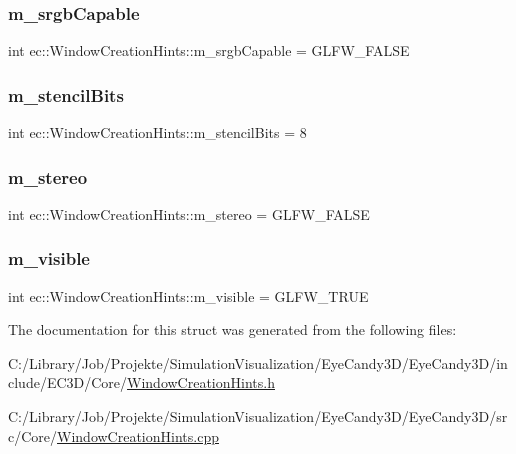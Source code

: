 \subsubsection{\texorpdfstring{m\+\_\+srgb\+Capable}{m\_srgbCapable}}
{\footnotesize\ttfamily int ec\+::\+Window\+Creation\+Hints\+::m\+\_\+srgb\+Capable = G\+L\+F\+W\+\_\+\+F\+A\+L\+SE}

\mbox{\label{structec_1_1_window_creation_hints_a634dc1277b13e3f6f9357adbb483e8eb}} 
\subsubsection{\texorpdfstring{m\+\_\+stencil\+Bits}{m\_stencilBits}}
{\footnotesize\ttfamily int ec\+::\+Window\+Creation\+Hints\+::m\+\_\+stencil\+Bits = 8}

\mbox{\label{structec_1_1_window_creation_hints_a729a2e0579e6344b78daa04f9ed34a9b}} 
\subsubsection{\texorpdfstring{m\+\_\+stereo}{m\_stereo}}
{\footnotesize\ttfamily int ec\+::\+Window\+Creation\+Hints\+::m\+\_\+stereo = G\+L\+F\+W\+\_\+\+F\+A\+L\+SE}

\mbox{\label{structec_1_1_window_creation_hints_ab32e332ec3126d619bbd920ee3842b3f}} 
\subsubsection{\texorpdfstring{m\+\_\+visible}{m\_visible}}
{\footnotesize\ttfamily int ec\+::\+Window\+Creation\+Hints\+::m\+\_\+visible = G\+L\+F\+W\+\_\+\+T\+R\+UE}



The documentation for this struct was generated from the following files\+:\begin{DoxyCompactItemize}
\item 
C\+:/\+Library/\+Job/\+Projekte/\+Simulation\+Visualization/\+Eye\+Candy3\+D/\+Eye\+Candy3\+D/include/\+E\+C3\+D/\+Core/\mbox{\hyperlink{_window_creation_hints_8h}{Window\+Creation\+Hints.\+h}}\item 
C\+:/\+Library/\+Job/\+Projekte/\+Simulation\+Visualization/\+Eye\+Candy3\+D/\+Eye\+Candy3\+D/src/\+Core/\mbox{\hyperlink{_window_creation_hints_8cpp}{Window\+Creation\+Hints.\+cpp}}\end{DoxyCompactItemize}
